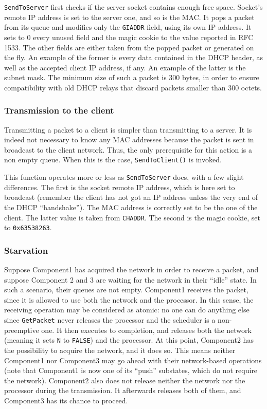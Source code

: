\texttt{SendToServer} first checks if the server socket contains enough free space. Socket's remote IP address is set to the server one, and so is the MAC. It pops a packet from its queue and modifies only the \texttt{GIADDR} field, using its own IP address. It sets to 0 every unused field and the magic cookie to the value reported in RFC 1533. The other fields are either taken from the popped packet or generated on the fly. An example of the former is every data contained in the DHCP header, as well as the accepted client IP address, if any. An example of the latter is the subnet mask. The minimum size of such a packet is 300 bytes, in order to ensure compatibility with old DHCP relays that discard
packets smaller than 300 octets. 

\subsubsection{Transmission to the client}
Transmitting a packet to a client is simpler than transmitting to a server. It is indeed not necessary to know any MAC addresses because the packet is sent in broadcast to the client network. Thus, the only prerequisite for this action is a non empty queue. When this is the case, \texttt{SendToClient()} is invoked.

This function operates more or less as \texttt{SendToServer} does, with a few slight differences. The first is the socket remote IP address, which is here set to broadcast (remember the client has not got an IP address unless the very end of the DHCP ``handshake''). The MAC address is correctly set to be the one of the client. The latter value is taken from \texttt{CHADDR}. The second is the magic cookie, set to \texttt{0x63538263}.

\subsubsection{Starvation}\label{sec:starvation}
Suppose Component1 has acquired the network in order to receive a packet, and suppose Component 2 and 3 are waiting for the network in their ``idle'' state. In such a scenario, their queues are not empty. Component1 receives the packet, since it is allowed to use both the network and the processor. In this sense, the receiving operation may be considered as atomic: no one can do anything else since \texttt{GetPacket} never releases the processor and the scheduler is a non-preemptive one. It then executes to completion, and releases both the network (meaning it sets \texttt{N} to \texttt{FALSE}) and the processor. At this point, Component2 has the possibility to acquire the network, and it does so. This means neither Component1 nor Component3 may go ahead with their network-based operations (note that Component1 is now one of its ``push'' substates, which do not require the network). Component2 also does not release neither the network nor the processor during the transmission. It afterwards releases both of them, and Component3 has its chance to proceed. 

